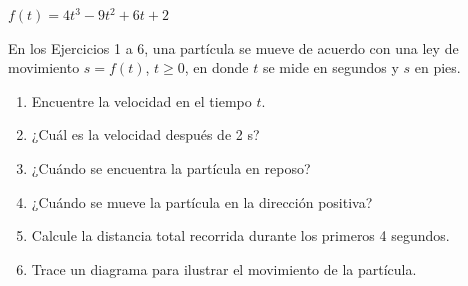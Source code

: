 \item $f(t) = 4t^3 - 9t^2 + 6t + 2$
\par
En los Ejercicios 1 a 6, una partícula se mueve de acuerdo con una ley de movimiento $s = f(t)$, $t \ge 0$, en donde $t$ se mide en segundos y $s$ en pies.
\begin{enumerate}
    \item[(a)] Encuentre la velocidad en el tiempo $t$.
    \item[(b)] ¿Cuál es la velocidad después de 2 s?
    \item[(c)] ¿Cuándo se encuentra la partícula en reposo?
    \item[(d)] ¿Cuándo se mueve la partícula en la dirección positiva?
    \item[(e)] Calcule la distancia total recorrida durante los primeros 4 segundos.
    \item[(f)] Trace un diagrama para ilustrar el movimiento de la partícula.
\end{enumerate}
